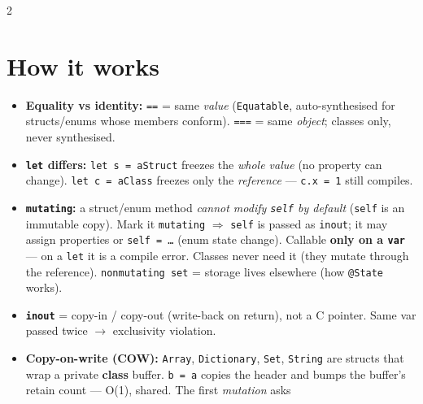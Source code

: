 \documentclass[8pt]{extarticle}
\begin{document}


\begin{multicols}{2}
\raggedright

\section{How it works}
\begin{itemize}
  \item \textbf{Equality vs identity:} \texttt{==} = same \emph{value}
        (\texttt{Equatable}, auto-synthesised for structs/enums whose members
        conform). \texttt{===} = same \emph{object}; classes only, never synthesised.
  \item \textbf{\texttt{let} differs:} \texttt{let s = aStruct} freezes the
        \emph{whole value} (no property can change). \texttt{let c = aClass}
        freezes only the \emph{reference} — \texttt{c.x = 1} still compiles.
  \item \textbf{\texttt{mutating}:} a struct/enum method \emph{cannot modify
        \texttt{self} by default} (\texttt{self} is an immutable copy). Mark it
        \texttt{mutating} $\Rightarrow$ \texttt{self} is passed as
        \texttt{inout}; it may assign properties or \texttt{self = …} (enum
        state change). Callable \textbf{only on a \texttt{var}} — on a
        \texttt{let} it is a compile error. Classes never need it (they mutate
        through the reference). \texttt{nonmutating set} = storage lives
        elsewhere (how \texttt{@State} works).
  \item \textbf{\texttt{inout}} = copy-in / copy-out (write-back on return), not a
        C pointer. Same var passed twice $\to$ exclusivity violation.
  \item \textbf{Copy-on-write (COW):} \texttt{Array}, \texttt{Dictionary},
        \texttt{Set}, \texttt{String} are structs that wrap a private
        \textbf{class} buffer. \texttt{b = a} copies the header and bumps the
        buffer's retain count — O(1), shared. The first \emph{mutation} asks

\end{itemize}
\end{multicols}
\end{document}
